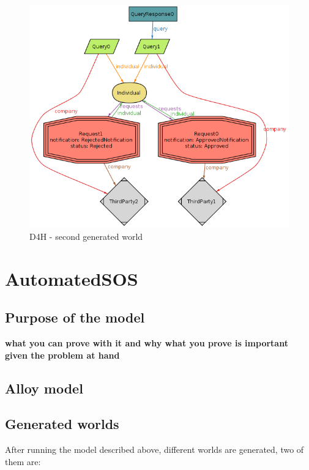 \documentclass[a4paper, hidelinks, 12pt]{report}
\begin{document}
	\begin{figure}[H]
		\centering
		\includegraphics[scale=0.55]{Diagrams/goal_2_world_2.png}
		\caption[D4H - second generated world]{D4H - second generated world}
		\label{fig:goal_2_world_2}
	\end{figure}
	
	\section{AutomatedSOS}
	\subsection{Purpose of the model}
	\textbf{what you can prove with it and why what you prove is important given the problem at hand}
	
	\subsection{Alloy model}
	\vspace{2 mm}
	
	
	
	\vspace{8 mm}
	
	\subsection{Generated worlds}
	After running the model described above, different worlds are generated, two of them are:
	
\end{document}
